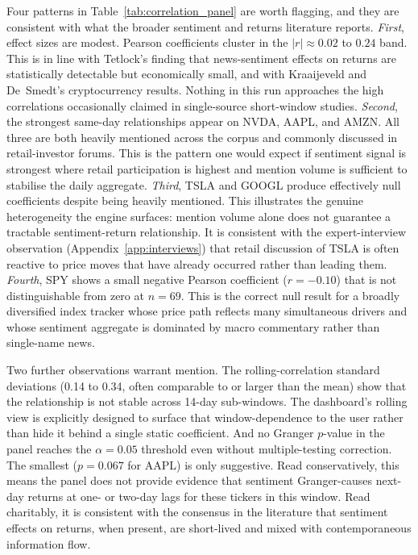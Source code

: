 Four patterns in Table~\ref{tab:correlation_panel} are worth flagging, and they are consistent with what the broader sentiment and returns literature reports. \emph{First}, effect sizes are modest. Pearson coefficients cluster in the $|r| \approx 0.02$ to $0.24$ band. This is in line with Tetlock's \citeyearpar{tetlock2007giving} finding that news-sentiment effects on returns are statistically detectable but economically small, and with Kraaijeveld and De~Smedt's \citeyearpar{kraaijeveld2020predictive} cryptocurrency results. Nothing in this run approaches the high correlations occasionally claimed in single-source short-window studies. \emph{Second}, the strongest same-day relationships appear on NVDA, AAPL, and AMZN. All three are both heavily mentioned across the corpus and commonly discussed in retail-investor forums. This is the pattern one would expect if sentiment signal is strongest where retail participation is highest and mention volume is sufficient to stabilise the daily aggregate. \emph{Third}, TSLA and GOOGL produce effectively null coefficients despite being heavily mentioned. This illustrates the genuine heterogeneity the engine surfaces: mention volume alone does not guarantee a tractable sentiment-return relationship. It is consistent with the expert-interview observation (Appendix~\ref{app:interviews}) that retail discussion of TSLA is often reactive to price moves that have already occurred rather than leading them. \emph{Fourth}, SPY shows a small negative Pearson coefficient ($r = -0.10$) that is not distinguishable from zero at $n = 69$. This is the correct null result for a broadly diversified index tracker whose price path reflects many simultaneous drivers and whose sentiment aggregate is dominated by macro commentary rather than single-name news.

Two further observations warrant mention. The rolling-correlation standard deviations (0.14 to 0.34, often comparable to or larger than the mean) show that the relationship is not stable across 14-day sub-windows. The dashboard's rolling view is explicitly designed to surface that window-dependence to the user rather than hide it behind a single static coefficient. And no Granger $p$-value in the panel reaches the $\alpha = 0.05$ threshold even without multiple-testing correction. The smallest ($p = 0.067$ for AAPL) is only suggestive. Read conservatively, this means the panel does not provide evidence that sentiment Granger-causes next-day returns at one- or two-day lags for these tickers in this window. Read charitably, it is consistent with the consensus in the literature that sentiment effects on returns, when present, are short-lived and mixed with contemporaneous information flow.

